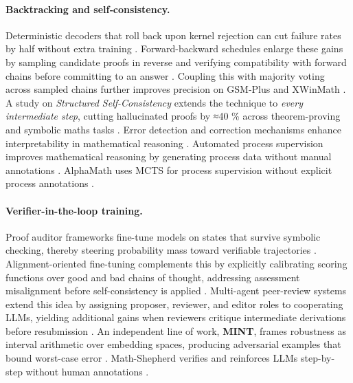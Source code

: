 \documentclass[acmsmall,anonymous]{acmart}
\begin{document}
\paragraph{Backtracking and self‐consistency.}
Deterministic decoders that roll back upon kernel rejection can cut failure rates by half without extra training \cite{lee2024backtracking}.  Forward-backward schedules enlarge these gains by sampling candidate proofs in reverse and verifying compatibility with forward chains before committing to an answer \cite{jiang-2024-forward-backward}.  Coupling this with majority voting across sampled chains further improves precision on GSM‐Plus and XWinMath \cite{li2024mugglemath}. A study on \emph{Structured Self-Consistency} extends the
  technique to \emph{every intermediate step}, cutting
  hallucinated proofs by ≈40 \% across theorem-proving and symbolic
  maths tasks \cite{Liu2025SC}. Error detection and correction mechanisms enhance interpretability in mathematical reasoning \cite{leiva2025errordetection,anonymous2025errordetection}. Automated process supervision improves mathematical reasoning by generating process data without manual annotations \cite{luo2024improve}. AlphaMath uses MCTS for process supervision without explicit process annotations \cite{wang2024 d alpha}.

\paragraph{Verifier-in-the-loop training.}
Proof auditor frameworks fine-tune models on states that survive symbolic checking, thereby steering probability mass toward verifiable trajectories \cite{wang2024mumath}.  Alignment-oriented fine-tuning complements this by explicitly calibrating scoring functions over good and bad chains of thought, addressing assessment misalignment before self-consistency is applied \cite{wang-2023-alignment-reasoning}.  Multi-agent peer-review systems extend this idea by assigning proposer, reviewer, and editor roles to cooperating LLMs, yielding additional gains when reviewers critique intermediate derivations before resubmission \cite{xu-2023-peer-review}.  An independent line of work, \textbf{MINT}, frames robustness as interval arithmetic over embedding spaces, producing adversarial examples that bound worst-case error \cite{li2024mint}. Math-Shepherd verifies and reinforces LLMs step-by-step without human annotations \cite{wang2024c}.
\end{document}
